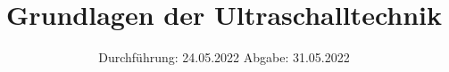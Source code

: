 

\subject{US1}
\title{Grundlagen der Ultraschalltechnik}
\date{
  Durchführung: 24.05.2022
  \hspace{3em}
  Abgabe: 31.05.2022
}



\maketitle
\thispagestyle{empty}
\tableofcontents
\newpage








\newpage
\printbibliography{}
\nocite{matplotlib}
\nocite{numpy}
\nocite{scipy}
\nocite{uncertainties}
\nocite{reback2020pandas}


